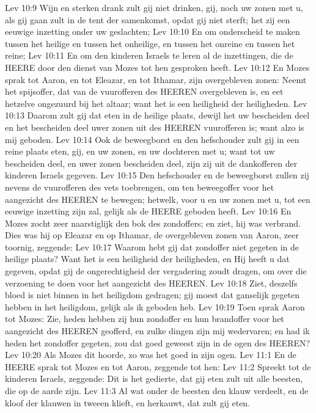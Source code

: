 Lev 10:9  Wijn en sterken drank zult gij niet drinken, gij, noch uw zonen met u, als gij gaan zult in de tent der samenkomst, opdat gij niet sterft; het zij een eeuwige inzetting onder uw geslachten;
Lev 10:10  En om onderscheid te maken tussen het heilige en tussen het onheilige, en tussen het onreine en tussen het reine;
Lev 10:11  En om den kinderen Israels te leren al de inzettingen, die de HEERE door den dienst van Mozes tot hen gesproken heeft.
Lev 10:12  En Mozes sprak tot Aaron, en tot Eleazar, en tot Ithamar, zijn overgebleven zonen: Neemt het spijsoffer, dat van de vuurofferen des HEEREN overgebleven is, en eet hetzelve ongezuurd bij het altaar; want het is een heiligheid der heiligheden.
Lev 10:13  Daarom zult gij dat eten in de heilige plaats, dewijl het uw bescheiden deel en het bescheiden deel uwer zonen uit des HEEREN vuurofferen is; want alzo is mij geboden.
Lev 10:14  Ook de beweegborst en den hefschouder zult gij in een reine plaats eten, gij, en uw zonen, en uw dochteren met u; want tot uw bescheiden deel, en uwer zonen bescheiden deel, zijn zij uit de dankofferen der kinderen Israels gegeven.
Lev 10:15  Den hefschouder en de beweegborst zullen zij nevens de vuurofferen des vets toebrengen, om ten beweegoffer voor het aangezicht des HEEREN te bewegen; hetwelk, voor u en uw zonen met u, tot een eeuwige inzetting zijn zal, gelijk als de HEERE geboden heeft.
Lev 10:16  En Mozes zocht zeer naarstiglijk den bok des zondoffers; en ziet, hij was verbrand. Dies was hij op Eleazar en op Ithamar, de overgebleven zonen van Aaron, zeer toornig, zeggende:
Lev 10:17  Waarom hebt gij dat zondoffer niet gegeten in de heilige plaats? Want het is een heiligheid der heiligheden, en Hij heeft u dat gegeven, opdat gij de ongerechtigheid der vergadering zoudt dragen, om over die verzoening te doen voor het aangezicht des HEEREN.
Lev 10:18  Ziet, deszelfs bloed is niet binnen in het heiligdom gedragen; gij moest dat ganselijk gegeten hebben in het heiligdom, gelijk als ik geboden heb.
Lev 10:19  Toen sprak Aaron tot Mozes: Zie, heden hebben zij hun zondoffer en hun brandoffer voor het aangezicht des HEEREN geofferd, en zulke dingen zijn mij wedervaren; en had ik heden het zondoffer gegeten, zou dat goed geweest zijn in de ogen des HEEREN?
Lev 10:20  Als Mozes dit hoorde, zo was het goed in zijn ogen.
Lev 11:1  En de HEERE sprak tot Mozes en tot Aaron, zeggende tot hen:
Lev 11:2  Spreekt tot de kinderen Israels, zeggende: Dit is het gedierte, dat gij eten zult uit alle beesten, die op de aarde zijn.
Lev 11:3  Al wat onder de beesten den klauw verdeelt, en de kloof der klauwen in tweeen klieft, en herkauwt, dat zult gij eten.
